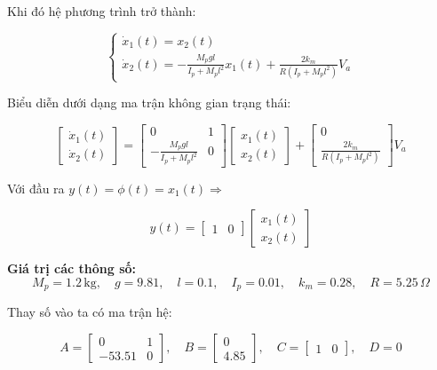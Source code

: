         Khi đó hệ phương trình trở thành:
        
        \[
        \begin{cases}
            \dot{x}_1(t) = x_2(t) \\
            \dot{x}_2(t) = -\frac{M_p g l}{I_p + M_p l^2} x_1(t) + \frac{2k_m}{R (I_p + M_p l^2)} V_a
        \end{cases}
        \]
        
        Biểu diễn dưới dạng ma trận không gian trạng thái:
        
        \begin{equation}
        \begin{bmatrix}
            \dot{x}_1(t) \\
            \dot{x}_2(t)
        \end{bmatrix}
        =
        \begin{bmatrix}
            0 & 1 \\
            -\frac{M_p g l}{I_p + M_p l^2} & 0
        \end{bmatrix}
        \begin{bmatrix}
            x_1(t) \\
            x_2(t)
        \end{bmatrix}
        +
        \begin{bmatrix}
            0 \\
            \frac{2k_m}{R (I_p + M_p l^2)}
        \end{bmatrix}
        V_a
        \end{equation}
        
        Với đầu ra \( y(t) = \phi(t) = x_1(t) \Rightarrow \)
        
        \[
        y(t) = \begin{bmatrix} 1 & 0 \end{bmatrix}
        \begin{bmatrix}
            x_1(t) \\
            x_2(t)
        \end{bmatrix}
        \]
        
        \textbf{Giá trị các thông số:}
        \[
            M_p = 1.2 \, \text{kg}, \quad g = 9.81, \quad l = 0.1, \quad I_p = 0.01, \quad k_m = 0.28, \quad R = 5.25 \, \Omega
        \]
        
        Thay số vào ta có ma trận hệ:
        
        \[
            A = \begin{bmatrix} 0 & 1 \\ -53.51 & 0 \end{bmatrix}, \quad
            B = \begin{bmatrix} 0 \\ 4.85 \end{bmatrix}, \quad
            C = \begin{bmatrix} 1 & 0 \end{bmatrix}, \quad
            D = 0
        \]
        
